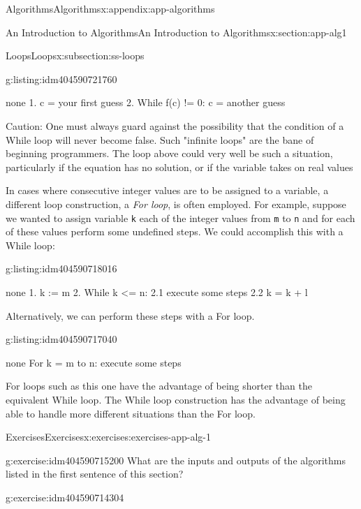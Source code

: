 \documentclass[twoside,10pt,]{book}
\newcommand{\mono}[1]{\texttt{#1}}
\numberwithin{equation}{section}
\begin{document}
\begin{appendixptx}{Algorithms}{}{Algorithms}{}{}{x:appendix:app-algorithms}
\begin{sectionptx}{An Introduction to Algorithms}{}{An Introduction to Algorithms}{}{}{x:section:app-alg1}
\begin{subsectionptx}{Loops}{}{Loops}{}{}{x:subsection:ss-loops}
\begin{listingptx}{}{g:listing:idm404590721760}{}
\begin{program}{none}
1. c = your first guess
2. While f(c) != 0:
		c = another guess
\end{program}
\tcblower
\end{listingptx}%
Caution: One must always guard against the possibility that the condition of a While loop will never become false. Such "infinite loops" are the bane of beginning programmers. The loop above could very well be such a situation, particularly if the equation has no solution, or if the variable takes on real values%
\par
In cases where  consecutive integer values are to be assigned to a variable, a different loop construction, a \emph{For loop}, is often employed. For example, suppose we wanted to assign variable \mono{k} each of the integer values from \mono{m} to \mono{n} and for each of these values perform some undefined steps. We could accomplish this with a While loop:%
\begin{listingptx}{}{g:listing:idm404590718016}{}%
\begin{program}{none}
1. k := m
2. While k <= n:
	2.1 execute some steps
	2.2 k = k + l
\end{program}
\tcblower
\end{listingptx}%
Alternatively, we can perform these steps with a For loop.%
\begin{listingptx}{}{g:listing:idm404590717040}{}%
\begin{program}{none}
For k = m to n:
	execute some  steps
\end{program}
\tcblower
\end{listingptx}%
For loops such as this one have the advantage of being shorter than the equivalent While loop. The While loop construction has the advantage of being able to handle more different situations than the For loop.%
\end{subsectionptx}
%
%
\typeout{************************************************}
\typeout{************************************************}
%
\begin{exercises-subsection}{Exercises}{}{Exercises}{}{}{x:exercises:exercises-app-alg-1}
\begin{divisionexercise}{1}{}{}{g:exercise:idm404590715200}%
What are the inputs and outputs of the algorithms listed in the first sentence of this section?%
\end{divisionexercise}%
\begin{divisionexercise}{2}{}{}{g:exercise:idm404590714304}%

\end{divisionexercise}
\end{exercises-subsection}
\end{sectionptx}
\end{appendixptx}
\end{document}
